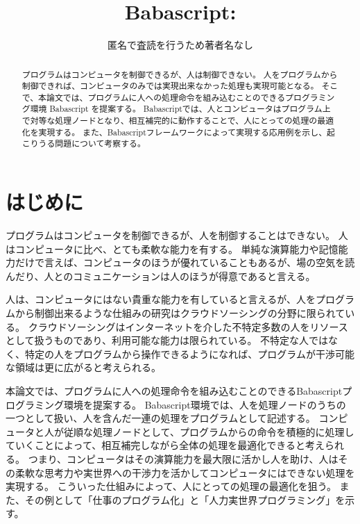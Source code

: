 \title{Babascript: }


\author{匿名で査読を行うため著者名なし
  }

\begin{abstract}

プログラムはコンピュータを制御できるが、人は制御できない。
人をプログラムから制御できれば、コンピュータのみでは実現出来なかった処理も実現可能となる。
そこで、本論文では、プログラムに人への処理命令を組み込むことのできるプログラミング環境 Babascript を提案する。
Babascriptでは、人とコンピュータはプログラム上で対等な処理ノードとなり、相互補完的に動作することで、人にとっての処理の最適化を実現する。
また、Babascriptフレームワークによって実現する応用例を示し、起こりうる問題について考察する。

\end{abstract}

\maketitle

\section{はじめに}\label{ux306fux3058ux3081ux306b}

プログラムはコンピュータを制御できるが、人を制御することはできない。
人はコンピュータに比べ、とても柔軟な能力を有する。
単純な演算能力や記憶能力だけで言えば、コンピュータのほうが優れていることもあるが、場の空気を読んだり、人とのコミュニケーションは人のほうが得意であると言える。

人は、コンピュータにはない貴重な能力を有していると言えるが、人をプログラムから制御出来るような仕組みの研究はクラウドソーシングの分野に限られている。
クラウドソーシングはインターネットを介した不特定多数の人をリソースとして扱うものであり、利用可能な能力は限られている。
不特定な人ではなく、特定の人をプログラムから操作できるようになれば、プログラムが干渉可能な領域は更に広がると考えられる。

本論文では、プログラムに人への処理命令を組み込むことのできるBabascriptプログラミング環境を提案する。
Babascript環境では、人を処理ノードのうちの一つとして扱い、人を含んだ一連の処理をプログラムとして記述する。
コンピュータと人が従順な処理ノードとして、プログラムからの命令を積極的に処理していくことによって、相互補完しながら全体の処理を最適化できると考えられる。
つまり、コンピュータはその演算能力を最大限に活かし人を助け、人はその柔軟な思考力や実世界への干渉力を活かしてコンピュータにはできない処理を実現する。
こういった仕組みによって、人にとっての処理の最適化を狙う。
また、その例として「仕事のプログラム化」と「人力実世界プログラミング」を示す。

